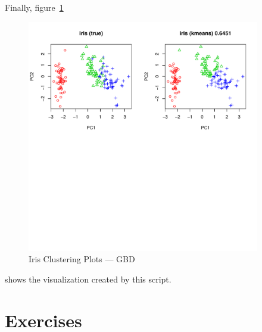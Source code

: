 Finally, figure~\ref{fig:iris_cluster_gbd}
\begin{figure}[h!bt]
  \centering
  \includegraphics[width=4in]{pbdDEMO-include/pics/dmat_plot.pdf}
  \caption{Iris Clustering Plots --- GBD}
  \label{fig:iris_cluster_gbd}
\end{figure}
shows the visualization created by this script.




\section{Exercises}
\label{sec:pmclust_exercise}

